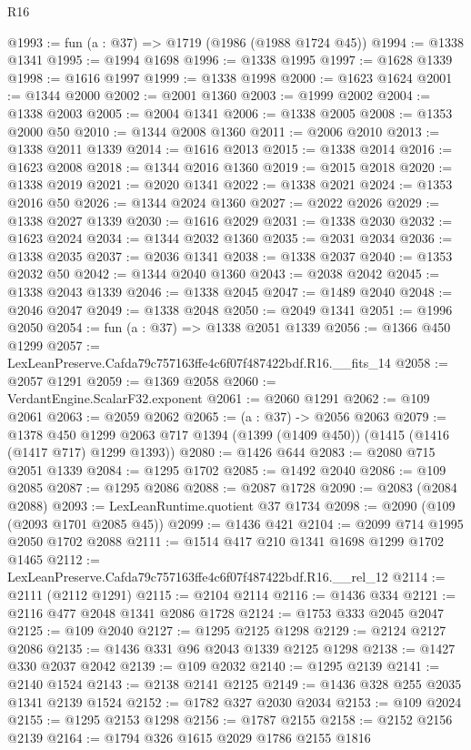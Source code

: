 \begin{lexlean}{R16}
\begin{coremodule}
@1993 := fun (a : @37) => @1719 (@1986 (@1988 @1724 @45))
@1994 := @1338 @1341
@1995 := @1994 @1698
@1996 := @1338 @1995
@1997 := @1628 @1339
@1998 := @1616 @1997
@1999 := @1338 @1998
@2000 := @1623 @1624
@2001 := @1344 @2000
@2002 := @2001 @1360
@2003 := @1999 @2002
@2004 := @1338 @2003
@2005 := @2004 @1341
@2006 := @1338 @2005
@2008 := @1353 @2000 @50
@2010 := @1344 @2008 @1360
@2011 := @2006 @2010
@2013 := @1338 @2011 @1339
@2014 := @1616 @2013
@2015 := @1338 @2014
@2016 := @1623 @2008
@2018 := @1344 @2016 @1360
@2019 := @2015 @2018
@2020 := @1338 @2019
@2021 := @2020 @1341
@2022 := @1338 @2021
@2024 := @1353 @2016 @50
@2026 := @1344 @2024 @1360
@2027 := @2022 @2026
@2029 := @1338 @2027 @1339
@2030 := @1616 @2029
@2031 := @1338 @2030
@2032 := @1623 @2024
@2034 := @1344 @2032 @1360
@2035 := @2031 @2034
@2036 := @1338 @2035
@2037 := @2036 @1341
@2038 := @1338 @2037
@2040 := @1353 @2032 @50
@2042 := @1344 @2040 @1360
@2043 := @2038 @2042
@2045 := @1338 @2043 @1339
@2046 := @1338 @2045
@2047 := @1489 @2040
@2048 := @2046 @2047
@2049 := @1338 @2048
@2050 := @2049 @1341
@2051 := @1996 @2050
@2054 := fun (a : @37) => @1338 @2051 @1339
@2056 := @1366 @450 @1299
@2057 := LexLeanPreserve.Cafda79c757163ffe4c6f07f487422bdf.R16.__fits_14
@2058 := @2057 @1291
@2059 := @1369 @2058
@2060 := VerdantEngine.ScalarF32.exponent
@2061 := @2060 @1291
@2062 := @109 @2061
@2063 := @2059 @2062
@2065 := (a : @37) -> @2056 @2063
@2079 := @1378
    @450
    @1299
    @2063
    @717
    @1394
    (@1399 (@1409 @450))
    (@1415 (@1416 (@1417 @717) @1299 @1393))
@2080 := @1426 @644
@2083 := @2080 @715 @2051 @1339
@2084 := @1295 @1702
@2085 := @1492 @2040
@2086 := @109 @2085
@2087 := @1295 @2086
@2088 := @2087 @1728
@2090 := @2083 (@2084 @2088)
@2093 := LexLeanRuntime.quotient @37 @1734
@2098 := @2090 (@109 (@2093 @1701 @2085 @45))
@2099 := @1436 @421
@2104 := @2099 @714 @1995 @2050 @1702 @2088
@2111 := @1514 @417 @210 @1341 @1698 @1299 @1702 @1465
@2112 := LexLeanPreserve.Cafda79c757163ffe4c6f07f487422bdf.R16.__rel_12
@2114 := @2111 (@2112 @1291)
@2115 := @2104 @2114
@2116 := @1436 @334
@2121 := @2116 @477 @2048 @1341 @2086 @1728
@2124 := @1753 @333 @2045 @2047
@2125 := @109 @2040
@2127 := @1295 @2125 @1298
@2129 := @2124 @2127 @2086
@2135 := @1436 @331 @96 @2043 @1339 @2125 @1298
@2138 := @1427 @330 @2037 @2042
@2139 := @109 @2032
@2140 := @1295 @2139
@2141 := @2140 @1524
@2143 := @2138 @2141 @2125
@2149 := @1436 @328 @255 @2035 @1341 @2139 @1524
@2152 := @1782 @327 @2030 @2034
@2153 := @109 @2024
@2155 := @1295 @2153 @1298
@2156 := @1787 @2155
@2158 := @2152 @2156 @2139
@2164 := @1794 @326 @1615 @2029 @1786 @2155 @1816

\end{coremodule}
\end{lexlean}
